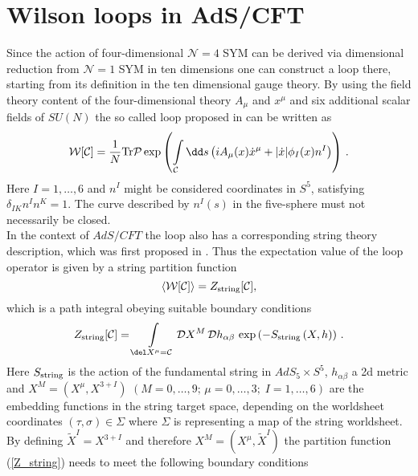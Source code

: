 \section{Wilson loops in AdS/CFT}
Since the action of four-dimensional $\mathcal{N}=4$ SYM can be derived via dimensional reduction from $\mathcal{N}=1$ SYM in ten dimensions \cite{BRINK197777} one can construct a  loop there, starting from its definition in the ten dimensional gauge theory. By using the field theory content of the four-dimensional theory $A_{\mu}$ and $x^{\mu}$ and six additional scalar fields of $SU(N)$ the so called  loop proposed in \cite{maldacena2} can be written as
%
%
\begin{equation}
\mathcal{W}[\mathcal{C}] = \frac{1}{N}{\rm Tr}\mathcal{P} \exp \left( \int\limits_{\mathcal{C}} \dd s \left( i A_{\mu}(x)\dot{x}^{\mu} +
\vert \dot{x}\vert \phi_{I}(x) n^{I} \right) \right) \,.
\end{equation}
%
%
Here $I=1,\ldots,6$ and $n^{I}$ might be considered coordinates in $S^{5}$, satisfying $\delta_{IK}n^{I}n^{K}=1$. The curve described by $n^{I}(s)$ in the five-sphere must not necessarily be closed. \\
%
%
In the context of $AdS/CFT$ the  loop also has a corresponding string theory description, which was first proposed in \cite{maldacena2}. Thus the expectation value of the  loop operator is given by a string partition function
%
%
\begin{equation}
\langle \mathcal{W}[\mathcal{C}]\rangle = Z_{\rm string}[\mathcal{C}],
\label{W_Z}
\end{equation}
%
%
which is a path integral obeying suitable boundary conditions
%
%
\begin{equation}
Z_{\rm string}[\mathcal{C}] = \int\limits_{\del X^{\mu}=\mathcal{C}} \mathcal{D}X^{M}\, \mathcal{D}h_{\alpha\beta}\, \exp \left(-S_{\rm string}\left( X,h \right) \right)\,.
\label{Z_string}
\end{equation}
%
%
Here $S_{\rm string}$ is the action of the fundamental string in $AdS_{5}\times S^{5}$, $h_{\alpha\beta}$ a 2d metric and ${X^{M}=(X^{\mu},X^{3+I})}$ ${(M=0,\ldots,9;\, \mu=0,\ldots,3; \; I=1,\ldots,6)}$ are the embedding functions in the string target space, depending on the worldsheet coordinates $(\tau,\sigma)\in \Sigma$ where $\Sigma$ is representing a map of the string worldsheet. By defining $\widetilde{X}^{I}=X^{3+I}$ and therefore $X^{M}=(X^{\mu},\widetilde{X}^{I})$ the partition function (\ref{Z_string}) needs to meet the following boundary conditions
